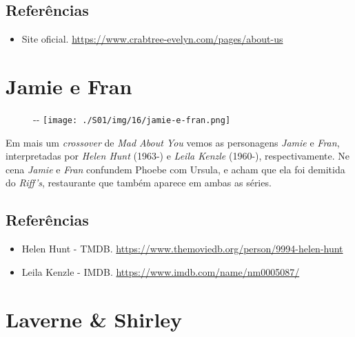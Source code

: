 \hypertarget{referuxeancias-3}{%
\subsection{Referências}\label{referuxeancias-3}}

\begin{itemize}
\tightlist
\item
  \sloppy Site oficial. \url{https://www.crabtree-evelyn.com/pages/about-us}
\end{itemize}

\hypertarget{jamie-e-fran}{%
\section{Jamie e Fran}\label{jamie-e-fran}}

\begin{figure}[!ht]
  \begin{adjustwidth}{-\oddsidemargin-1in}{-\rightmargin}
    \centering
    \texttt{[image: ./S01/img/16/jamie-e-fran.png]}
  \end{adjustwidth}
\end{figure}

Em mais um \emph{crossover} de \emph{Mad About You} vemos as personagens
\emph{Jamie} e \emph{Fran}, interpretadas por \emph{Helen Hunt} (1963-)
e \emph{Leila Kenzle} (1960-), respectivamente. Ne cena \emph{Jamie} e
\emph{Fran} confundem Phoebe com Ursula, e acham que ela foi demitida do
\emph{Riff's}, restaurante que também aparece em ambas as séries.

\hypertarget{referuxeancias-4}{%
\subsection{Referências}\label{referuxeancias-4}}

\begin{itemize}
\tightlist
\item
  \sloppy Helen Hunt - TMDB. \url{https://www.themoviedb.org/person/9994-helen-hunt}
\item
  \sloppy Leila Kenzle - IMDB. \url{https://www.imdb.com/name/nm0005087/}
\end{itemize}

\hypertarget{laverne-shirley}{%
\section{Laverne \& Shirley}\label{laverne-shirley}}

